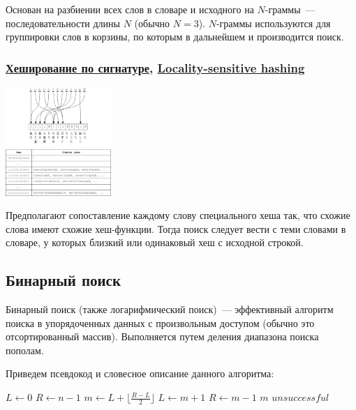 Основан на разбиении всех слов в словаре и исходного на \(N\)-граммы~--- последовательности длины \(N\) (обычно \(N = 3\)).
\(N\)-граммы используются для группировки слов в корзины, по которым в дальнейшем и производится поиск.

\subsubsection{\href{https://cs.msu.ru/sites/cmc/files/docs/boycov.pdf}{Хеширование по сигнатуре}, \href{https://en.wikipedia.org/wiki/Locality-sensitive_hashing\#Bit_sampling_for_Hamming_distance}{Locality-sensitive hashing}}

\begin{center}
  \includegraphics[width=0.3\textwidth]{resources/19-26/hash.png}
\end{center}
Предполагают сопоставление каждому слову специального хеша так, что схожие слова имеют схожие хеш-функции. Тогда поиск следует вести с
теми словами в словаре, у которых близкий или одинаковый хеш с исходной строкой.

\subsection{Бинарный поиск}
Бинарный поиск (также логарифмический поиск)~--- эффективный алгоритм поиска в упорядоченных данных с произвольным доступом
(обычно это отсортированный массив). Выполняется путем деления диапазона поиска пополам.

Приведем псевдокод и словесное описание данного алгоритма:
\begin{algorithmic}
  \State $L \gets 0$
  \State $R \gets n - 1$
  \State $m \gets L + \lfloor\frac{R - L}{2}\rfloor$
  \State $L \gets m + 1$
  \State $R \gets m - 1$
  \Else
  \State \Return $m$
  \EndIf
  \EndWhile
  \State \Return $unsuccessful$
  \EndFunction
\end{algorithmic}

\bigbreak

